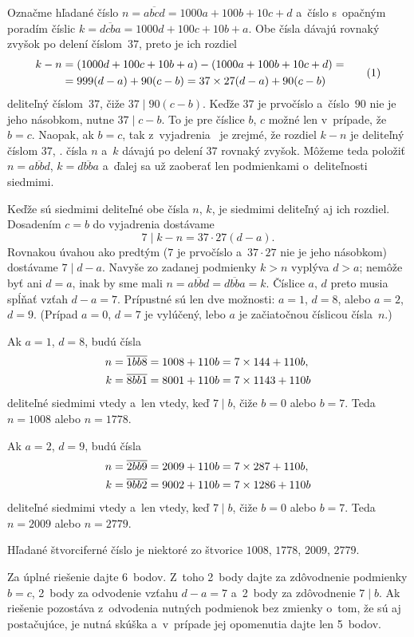 {%
Označme hľadané číslo $n=\overline{abcd}=1000a+100b+10c+d$ a~číslo s~opačným poradím číslic $k=\overline{dcba}=1000d+100c+10b+a$. Obe čísla dávajú rovnaký zvyšok po delení číslom~$37$, preto je ich rozdiel
$$
\aligned
k-n&=(1000d+100c+10b+a)-(1000a+100b+10c+d)=\\
&=999(d-a)+90(c-b)=37\cdot27(d-a)+90(c-b)
\endaligned
\tag1
$$
deliteľný číslom~$37$, čiže $37\mid 90(c-b)$. Keďže $37$ je prvočíslo a~číslo~$90$ nie je jeho násobkom, nutne $37\mid c-b$. To je pre číslice $b$, $c$ možné len v~prípade, že $b=c$. Naopak, ak $b=c$, tak z~vyjadrenia~ je zrejmé, že rozdiel $k-n$ je deliteľný číslom $37$, \tj. čísla $n$ a~$k$ dávajú po delení $37$ rovnaký zvyšok. Môžeme teda položiť $n=\overline{abbd}$, $k=\overline{dbba}$ a~ďalej sa už zaoberať len podmienkami o~deliteľnosti siedmimi.

Keďže sú siedmimi deliteľné obe čísla $n$, $k$, je siedmimi deliteľný aj ich rozdiel. Dosadením $c=b$ do vyjadrenia  dostávame
$$
7\mid k-n=37\cdot27(d-a).
$$
Rovnakou úvahou ako predtým ($7$ je prvočíslo a~$37\cdot27$ nie je jeho násobkom) dostávame $7\mid d-a$. Navyše zo zadanej podmienky $k>n$ vyplýva $d>a$; nemôže byť ani $d=a$, inak by sme mali $n=\overline{abbd}=\overline{dbba}=k$. Číslice $a$, $d$ preto musia spĺňať vzťah $d-a=7$. Prípustné sú len dve možnosti: $a=1$, $d=8$, alebo $a=2$, $d=9$. (Prípad $a=0$, $d=7$ je vylúčený, lebo $a$ je začiatočnou číslicou čísla~$n$.)

Ak $a=1$, $d=8$, budú čísla
$$
\aligned
n&=\overline{1bb8}=1008+110b=7\cdot144+110b,\\
k&=\overline{8bb1}=8001+110b=7\cdot1143+110b
\endaligned
$$
deliteľné siedmimi vtedy a~len vtedy, keď $7\mid b$, čiže $b=0$ alebo $b=7$. Teda $n=1008$ alebo $n=1778$.

Ak $a=2$, $d=9$, budú čísla
$$
\aligned
n&=\overline{2bb9}=2009+110b=7\cdot287+110b,\\
k&=\overline{9bb2}=9002+110b=7\cdot1286+110b
\endaligned
$$
deliteľné siedmimi vtedy a~len vtedy, keď $7\mid b$, čiže $b=0$ alebo $b=7$. Teda $n=2009$ alebo $n=2779$.

\odpoved
Hľadané štvorciferné číslo je niektoré zo štvorice $1008$, $1778$, $2009$, $2779$.

\nobreak\medskip\petit\noindent
Za úplné riešenie dajte 6~bodov. Z~toho 2~body dajte za zdôvodnenie podmienky $b=c$, 2~body za odvodenie vzťahu $d-a=7$ a~2~body za zdôvodnenie $7\mid b$. Ak riešenie pozostáva z~odvodenia nutných podmienok bez zmienky o~tom, že sú aj postačujúce, je nutná skúška a~v~prípade jej opomenutia dajte len 5~bodov.
\endpetit
\bigbreak}

